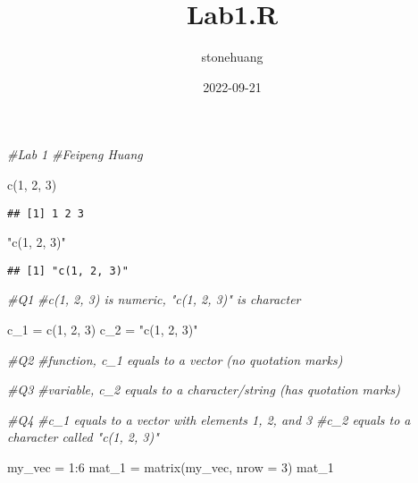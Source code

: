 \documentclass[
]{article}
\title{Lab1.R}
\author{stonehuang}
\date{2022-09-21}
\newenvironment{Shaded}{\begin{snugshade}}{\end{snugshade}}
\newcommand{\AttributeTok}[1]{\textcolor[rgb]{0.77,0.63,0.00}{#1}}
\newcommand{\CommentTok}[1]{\textcolor[rgb]{0.56,0.35,0.01}{\textit{#1}}}
\newcommand{\DecValTok}[1]{\textcolor[rgb]{0.00,0.00,0.81}{#1}}
\newcommand{\FunctionTok}[1]{\textcolor[rgb]{0.00,0.00,0.00}{#1}}
\newcommand{\NormalTok}[1]{#1}
\newcommand{\OtherTok}[1]{\textcolor[rgb]{0.56,0.35,0.01}{#1}}
\newcommand{\SpecialCharTok}[1]{\textcolor[rgb]{0.00,0.00,0.00}{#1}}
\newcommand{\StringTok}[1]{\textcolor[rgb]{0.31,0.60,0.02}{#1}}
\begin{document}
\maketitle

\begin{Shaded}
\begin{Highlighting}[]
\CommentTok{\#Lab 1}
\CommentTok{\#Feipeng Huang}

\FunctionTok{c}\NormalTok{(}\DecValTok{1}\NormalTok{, }\DecValTok{2}\NormalTok{, }\DecValTok{3}\NormalTok{)}
\end{Highlighting}
\end{Shaded}

\begin{verbatim}
## [1] 1 2 3
\end{verbatim}

\begin{Shaded}
\begin{Highlighting}[]
\StringTok{"c(1, 2, 3)"}
\end{Highlighting}
\end{Shaded}

\begin{verbatim}
## [1] "c(1, 2, 3)"
\end{verbatim}

\begin{Shaded}
\begin{Highlighting}[]
\CommentTok{\#Q1}
\CommentTok{\#c(1, 2, 3) is numeric, "c(1, 2, 3)" is character}

\NormalTok{c\_1 }\OtherTok{=} \FunctionTok{c}\NormalTok{(}\DecValTok{1}\NormalTok{, }\DecValTok{2}\NormalTok{, }\DecValTok{3}\NormalTok{)}
\NormalTok{c\_2 }\OtherTok{=} \StringTok{"c(1, 2, 3)"}

\CommentTok{\#Q2}
\CommentTok{\#function, c\_1 equals to a vector (no quotation marks)}

\CommentTok{\#Q3}
\CommentTok{\#variable, c\_2 equals to a character/string (has quotation marks)}

\CommentTok{\#Q4}
\CommentTok{\#c\_1 equals to a vector with elements 1, 2, and 3}
\CommentTok{\#c\_2 equals to a character called "c(1, 2, 3)"}

\NormalTok{my\_vec }\OtherTok{=} \DecValTok{1}\SpecialCharTok{:}\DecValTok{6}
\NormalTok{mat\_1 }\OtherTok{=} \FunctionTok{matrix}\NormalTok{(my\_vec, }\AttributeTok{nrow =} \DecValTok{3}\NormalTok{)}
\NormalTok{mat\_1}
\end{Highlighting}
\end{Shaded}
\end{document}
